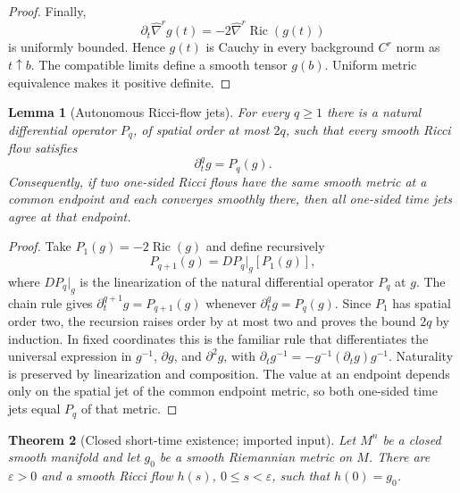 \documentclass[10pt]{coll-l}
\newtheorem{theorem}{Theorem}[chapter]
\newtheorem{lemma}[theorem]{Lemma}
\theoremstyle{definition}
\theoremstyle{remark}
\numberwithin{section}{chapter}
\numberwithin{equation}{chapter}
\newcommand{\Ric}{\operatorname{Ric}}
\begin{document}
\begin{proof}
Finally,
\begin{equation}
       \partial_t\widehat\nabla^r g(t)
           =-2\widehat\nabla^r\Ric(g(t))                 \label{eq:shi-background-g-time}
\end{equation}
is uniformly bounded.  Hence $g(t)$ is Cauchy in every background $C^r$
norm as $t\uparrow b$.  The compatible limits define a smooth tensor
$g(b)$.  Uniform metric equivalence makes it positive definite.
\end{proof}

\begin{lemma}[Autonomous Ricci-flow jets]
\label{lem:shi-autonomous-jets}
For every $q\geq1$ there is a natural differential operator $P_q$, of
spatial order at most $2q$, such that every smooth Ricci flow satisfies
\begin{equation}
                       \partial_t^qg=P_q(g).              \label{eq:shi-autonomous-jets}
\end{equation}
Consequently, if two one-sided Ricci flows have the same smooth metric at a
common endpoint and each converges smoothly there, then all one-sided time
jets agree at that endpoint.
\end{lemma}

\begin{proof}
Take $P_1(g)=-2\Ric(g)$ and define recursively
\begin{equation}
             P_{q+1}(g)=DP_q|_g[P_1(g)],                 \label{eq:shi-Pq-recursion}
\end{equation}
where $DP_q|_g$ is the linearization of the natural differential operator
$P_q$ at $g$.  The chain rule gives
$\partial_t^{q+1}g=P_{q+1}(g)$ whenever
$\partial_t^qg=P_q(g)$.  Since $P_1$ has spatial order two, the recursion
raises order by at most two and proves the bound $2q$ by induction.  In
fixed coordinates this is the familiar rule that differentiates the
universal expression in $g^{-1}$, $\partial g$, and $\partial^2g$, with
$\partial_tg^{-1}=-g^{-1}(\partial_tg)g^{-1}$.  Naturality is preserved by
linearization and composition.  The value at an endpoint depends only on
the spatial jet of the common endpoint metric, so both one-sided time jets
equal $P_q$ of that metric.
\end{proof}

\begin{theorem}[Closed short-time existence; imported input]
\label{thm:shi-closed-short-time-input}
Let $M^n$ be a closed smooth manifold and let $g_0$ be a smooth Riemannian
metric on $M$.  There are $\varepsilon>0$ and a smooth Ricci flow $h(s)$,
$0\leq s<\varepsilon$, such that $h(0)=g_0$.
\end{theorem}
\end{document}

